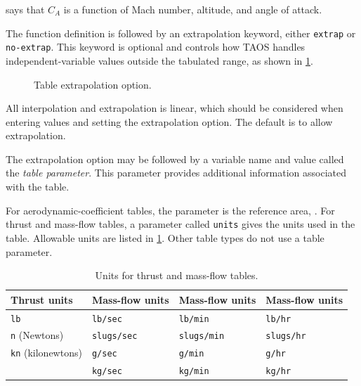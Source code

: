 says that $C_A$ is a function of Mach number, altitude, and angle of attack.


The function definition is followed by an extrapolation keyword, either
\texttt{extrap} or \texttt{no-extrap}. This keyword is optional and controls how
TAOS handles independent-variable values outside the tabulated range, as shown in
\cref{fig:table-extrapolation-option}.

\begin{figure}[htbp]
  \centering
  
  \caption{Table extrapolation option.}
  \label{fig:table-extrapolation-option}
\end{figure}

All interpolation and extrapolation is linear, which should be considered when
entering values and setting the extrapolation option. The default is to allow
extrapolation.


The extrapolation option may be followed by a variable name and value called the
\emph{table parameter}. This parameter provides additional information associated
with the table.

For aerodynamic-coefficient tables, the parameter is the reference area,
. For thrust and mass-flow tables, a parameter called \texttt{units}
gives the units used in the table. Allowable units are listed in
\cref{tab:thrust-mass-flow-units}. Other table types do not use a table parameter.

\begin{table}[htbp]
  \centering
  \caption{Units for thrust and mass-flow tables.}
  \label{tab:thrust-mass-flow-units}
  \begin{tabular}{@{}llll@{}}
    \toprule
    Thrust units & Mass-flow units & Mass-flow units & Mass-flow units \\
    \midrule
    \texttt{lb} & \texttt{lb/sec} & \texttt{lb/min} & \texttt{lb/hr} \\
    \texttt{n} (Newtons) & \texttt{slugs/sec} & \texttt{slugs/min} & \texttt{slugs/hr} \\
    \texttt{kn} (kilonewtons) & \texttt{g/sec} & \texttt{g/min} & \texttt{g/hr} \\
    & \texttt{kg/sec} & \texttt{kg/min} & \texttt{kg/hr} \\
    \bottomrule
  \end{tabular}
\end{table}

